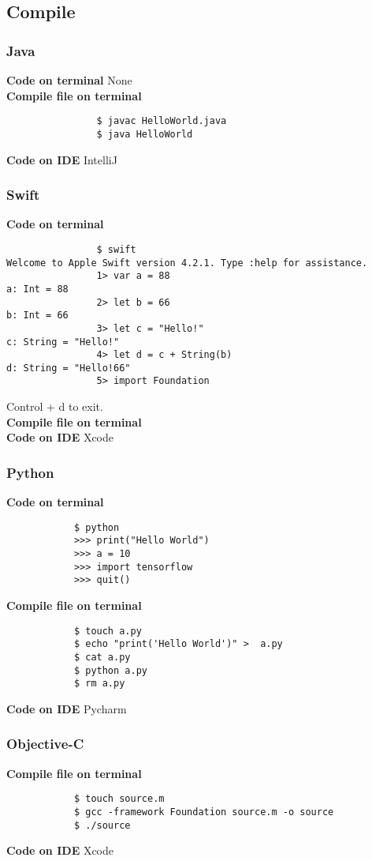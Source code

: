 \documentclass[12pt, a4pape]{article}
\begin{document}
	\subsection{Compile}
		\subsubsection{Java}
			\textbf{Code on terminal} 
			None \\
			\textbf{Compile file on terminal} 
			\begin{lstlisting}
				$ javac HelloWorld.java
				$ java HelloWorld
			\end{lstlisting}
			\textbf{Code on IDE} IntelliJ

		\subsubsection{Swift}
			\textbf{Code on terminal}  
			\begin{lstlisting}
				$ swift
Welcome to Apple Swift version 4.2.1. Type :help for assistance.
				1> var a = 88
a: Int = 88
				2> let b = 66
b: Int = 66
				3> let c = "Hello!"
c: String = "Hello!"
				4> let d = c + String(b)
d: String = "Hello!66"
				5> import Foundation
			\end{lstlisting}
			Control + d to exit. \\
			\textbf{Compile file on terminal}  \\
			\textbf{Code on IDE} Xcode
		
		\subsubsection{Python}
			\textbf{Code on terminal}  
			\begin{lstlisting}
			$ python
			>>> print("Hello World")
			>>> a = 10
			>>> import tensorflow
			>>> quit()
			\end{lstlisting}
			\textbf{Compile file on terminal}  
			\begin{lstlisting}
			$ touch a.py
			$ echo "print('Hello World')" >  a.py
			$ cat a.py 	
			$ python a.py
			$ rm a.py
			\end{lstlisting}
			\textbf{Code on IDE} Pycharm 
		
		\subsubsection{Objective-C}
			\textbf{Compile file on terminal}
			\begin{lstlisting}
			$ touch source.m
			$ gcc -framework Foundation source.m -o source
			$ ./source
			\end{lstlisting}
			\textbf{Code on IDE} Xcode
			
\end{document}
